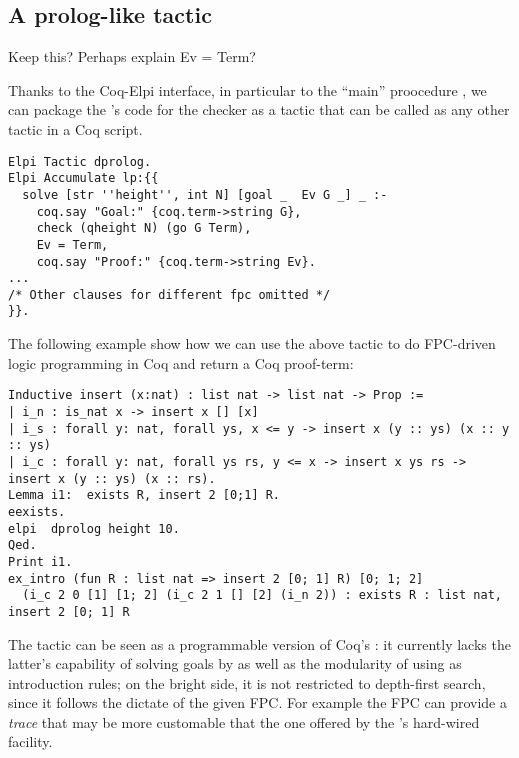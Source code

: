 

\subsection{A prolog-like tactic}

\begin{metanote}
Keep this? Perhaps explain Ev = Term?
\end{metanote}

Thanks to the Coq-Elpi interface, in particular to the ``main''
proocedure , we can package the \lP's code for the checker
as a tactic that can be called as any other tactic in a Coq script.

\begin{lstlisting}
Elpi Tactic dprolog.
Elpi Accumulate lp:{{
  solve [str ''height'', int N] [goal _  Ev G _] _ :-
    coq.say "Goal:" {coq.term->string G},
    check (qheight N) (go G Term),
    Ev = Term,
    coq.say "Proof:" {coq.term->string Ev}.
...
/* Other clauses for different fpc omitted */
}}.
\end{lstlisting}
The following example show how we can use the above tactic to do
FPC-driven logic programming in Coq and return a Coq proof-term:
\begin{lstlisting}
Inductive insert (x:nat) : list nat -> list nat -> Prop :=
| i_n : is_nat x -> insert x [] [x]
| i_s : forall y: nat, forall ys, x <= y -> insert x (y :: ys) (x :: y :: ys)
| i_c : forall y: nat, forall ys rs, y <= x -> insert x ys rs -> insert x (y :: ys) (x :: rs).
Lemma i1:  exists R, insert 2 [0;1] R.
eexists.
elpi  dprolog height 10.
Qed.
Print i1.
ex_intro (fun R : list nat => insert 2 [0; 1] R) [0; 1; 2]
  (i_c 2 0 [1] [1; 2] (i_c 2 1 [] [2] (i_n 2)) : exists R : list nat, insert 2 [0; 1] R
\end{lstlisting}

The  tactic can be seen as a programmable version of
Coq's : it currently lacks the latter's capability of
solving goals by  as well as the modularity of using
 as introduction rules; on the bright side, it is not
restricted to depth-first search, since it follows the dictate of the
given FPC. For example the FPC can provide a \emph{trace} that may be
more customable that the one offered by the 's hard-wired
 facility.
%

